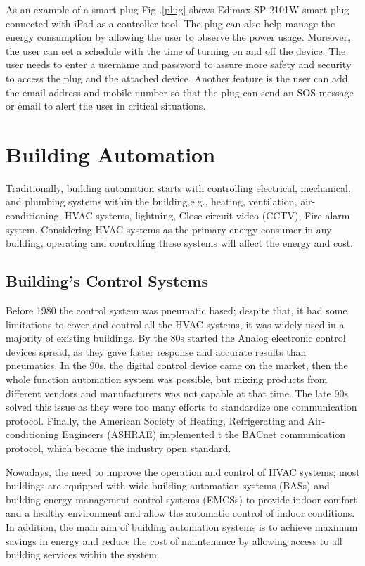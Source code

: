 \documentclass[conference]{IEEEtran}
\begin{document}
As an example of a smart plug Fig .\ref{plug} shows  Edimax SP-2101W smart plug connected with iPad as a controller tool. The plug can also help manage the energy consumption by allowing the user to observe the power usage. Moreover, the user can set a schedule with the time of turning on and off the device. The user needs to enter a username and password to assure more safety and security to access the plug and the attached device. Another feature is the user can add the email address and mobile number so that the plug can send an SOS message or email to alert the user in critical situations. 


\section{Building  Automation }

Traditionally, building automation starts with controlling electrical, mechanical, and plumbing systems within the building,e.g., heating, ventilation, air-conditioning, HVAC systems, lightning,  Close circuit video (CCTV), Fire alarm system. Considering HVAC systems as the primary energy consumer in any building, operating and controlling these systems will affect the energy and cost.

\subsection{Building's Control Systems}

Before 1980 the control system was pneumatic based; despite that, it had some limitations to cover and control all the HVAC systems, it was widely used in a majority of existing buildings. By the 80s started the Analog electronic control devices spread, as they gave faster response and accurate results than pneumatics\cite{art}. In the 90s, the digital control device came on the market, then the whole function automation system was possible, but mixing products from different vendors and manufacturers was not capable at that time. The late 90s solved this issue as they were too many efforts to standardize one communication protocol. Finally, the American Society of Heating, Refrigerating and Air-conditioning Engineers (ASHRAE) implemented t the BACnet communication protocol, which became the industry open standard.\cite{control}\cite{art1}

 Nowadays, the need to improve the operation and control of HVAC systems; most buildings are equipped with wide building automation systems (BASs) and building energy management control systems (EMCSs) to provide indoor comfort and a healthy environment and allow the automatic control of indoor conditions. In addition, the main aim of building automation systems is to achieve maximum savings in energy and reduce the cost of maintenance by allowing access to all building services within the system.
\end{document}
